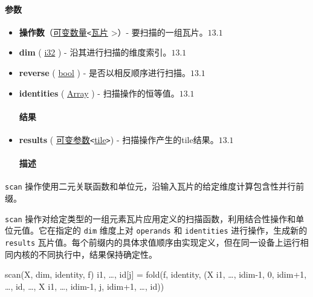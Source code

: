 \documentclass{article}
\begin{document}
\paragraph{参数}

\begin{itemize}
\item \textbf{操作数}（\href{https://docs.nvidia.com/cuda/tile-ir/latest/sections/operations.html#type-variadic}{可变数量}\texttt{<}\href{https://docs.nvidia.com/cuda/tile-ir/latest/sections/types.html#type-tile}{瓦片} >）- 要扫描的一组瓦片。$\boxed{13.1}$
\item \textbf{dim} ( \href{https://docs.nvidia.com/cuda/tile-ir/latest/sections/types.html#subsection-element-types}{i32} ) - 沿其进行扫描的维度索引。$\boxed{13.1}$
\item \textbf{reverse} ( \href{https://docs.nvidia.com/cuda/tile-ir/latest/sections/operations.html#type-bool}{bool} ) - 是否以相反顺序进行扫描。$\boxed{13.1}$
\item \textbf{identities} ( \href{https://docs.nvidia.com/cuda/tile-ir/latest/sections/operations.html#type-array}{Array} ) - 扫描操作的恒等值。$\boxed{13.1}$


\paragraph{结果}

\item \textbf{results} ( \href{https://docs.nvidia.com/cuda/tile-ir/latest/sections/operations.html#type-variadic}{可变参数}\texttt{<}\href{https://docs.nvidia.com/cuda/tile-ir/latest/sections/types.html#type-tile}{tile}\texttt{>}) - 扫描操作产生的tile结果。$\boxed{13.1}$


\paragraph{描述}

\end{itemize}
\texttt{scan} 操作使用二元关联函数和单位元，沿输入瓦片的给定维度计算包含性并行前缀。


\texttt{scan} 操作对给定类型的一组元素瓦片应用定义的扫描函数，利用结合性操作和单位元值。它在指定的 \texttt{dim} 维度上对 \texttt{operands} 和 \texttt{identities} 进行操作，生成新的 \texttt{results} 瓦片值。每个前缀内的具体求值顺序由实现定义，但在同一设备上运行相同内核的不同执行中，结果保持确定性。


scan(X, dim, identity, f) i1, …, id[j] = fold(f, identity, (X i1, …, idim-1, 0, idim+1, …, id, …, X i1, …, idim-1, j, idim+1, …, id))
\end{document}
